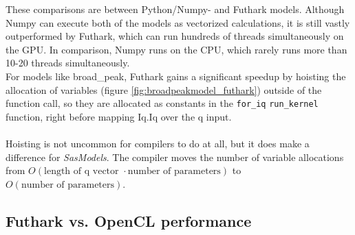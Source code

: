 \documentclass[11pt]{article}
\newcommand{\sasmodels}{\textit{SasModels}}
\newcommand{\foriq}{\texttt{for\_iq}}
\begin{document}
\begin{mdframed}[
  frametitle={Why does Futhark perform faster than Python?},
  nobreak=true
  ]
These comparisons are between Python/Numpy- and Futhark models.
Although Numpy can execute both of the models as vectorized calculations, 
it is still vastly outperformed by Futhark, which can run hundreds of threads 
simultaneously on the GPU. In comparison, Numpy runs on the CPU, which rarely 
runs more than 10-20 threads simultaneously.
\\
For models like broad\_peak, Futhark gains a significant speedup by 
hoisting\cite[sec 2.3]{pldi17} the allocation of variables 
(figure \ref{fig:broadpeakmodel_futhark}) outside of
the function call, so they are allocated as constants in the \foriq{} 
\texttt{run\_kernel} function, right before mapping Iq.Iq over the q input.
\\\\
Hoisting is not uncommon for compilers to do at all, but it does make a 
difference for \sasmodels{}.
The compiler moves the number of variable allocations from
$O(\text{length of q vector } \cdot \text{number of parameters})$ to 
$O(\text{number of parameters})$.
\end{mdframed}

\subsection{Futhark vs. OpenCL performance}
\end{document}

